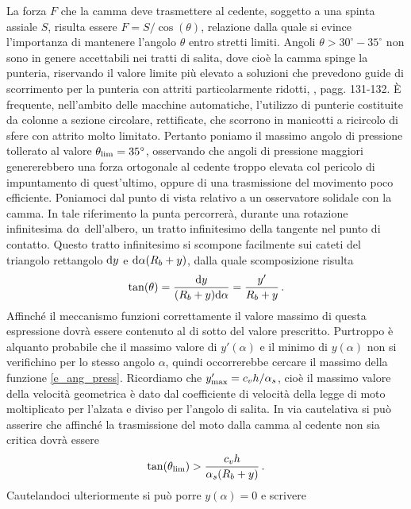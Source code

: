 La forza $F$  che la camma deve trasmettere al cedente,
soggetto a una spinta assiale $S$, risulta
essere $F=S/\cos(\theta)$, relazione dalla quale si evince l'importanza
di mantenere l'angolo $\theta$ entro stretti limiti.
Angoli $\theta > 30^{\circ}-35^{\circ}$ non sono
in genere accettabili nei tratti di salita, dove cio\`e la camma spinge la
punteria, riservando il valore limite pi\`u elevato a soluzioni
che prevedono guide di scorrimento per la punteria con attriti particolarmente
ridotti, \cite{molian}, pagg. 131-132. \`E frequente, nell'ambito delle macchine
automatiche, l'utilizzo di punterie costituite da colonne 
a sezione circolare, rettificate, che scorrono in manicotti a ricircolo di
sfere con attrito molto limitato.
Pertanto poniamo il massimo angolo di
pressione tollerato al valore $\theta_{\rm lim}=35^{\circ}$, osservando che angoli
di pressione maggiori genererebbero una forza ortogonale al cedente troppo
elevata col pericolo di impuntamento di quest'ultimo, oppure di una trasmissione
del movimento poco efficiente.
Poniamoci dal punto di vista relativo a un osservatore solidale con la camma.
In tale riferimento la punta percorrer\`a, durante una rotazione infinitesima
${\rm d}\alpha$ dell'albero, un tratto infinitesimo della tangente nel punto di contatto.
Questo tratto infinitesimo si scompone facilmente sui cateti 
del triangolo rettangolo
${\rm d}y$ e ${\rm d}\alpha (R_b +y)$, dalla quale scomposizione risulta
\begin{equation}
\tan(\theta)={{\rm d}y\over{(R_b+y)}{\rm d}\alpha}= {y'\over{R_b+y}}\,.
\label{e_ang_press}
\end{equation}
\noindent Affinch\'e il meccanismo funzioni correttamente il valore massimo di questa espressione dovr\`a essere contenuto al di
sotto del valore prescritto. Purtroppo \`e alquanto probabile che il massimo valore di $y'(\alpha)$ e il minimo di $y(\alpha)$ non si verifichino per lo
stesso angolo $\alpha$, quindi 
occorrerebbe cercare il massimo della funzione \ref{e_ang_press}. 
\noindent Ricordiamo che $y'_{\rm max}=c_v h/\alpha_s$, cio\`e il massimo
valore della velocit\`a geometrica \`e dato dal coefficiente di velocit\`a
della legge di moto moltiplicato per l'alzata e diviso per l'angolo di salita.
In via cautelativa si pu\`o asserire che affinch\'e la trasmissione del moto
dalla camma al cedente non sia critica dovr\`a essere 
\begin{equation}
\tan(\theta_{\rm lim})> {c_v h\over{\alpha_s(R_b+y)}}\,.
\label{e_ang_press_cv}
\end{equation}
\noindent Cautelandoci ulteriormente si pu\`o porre  $y(\alpha)=0$ e scrivere
